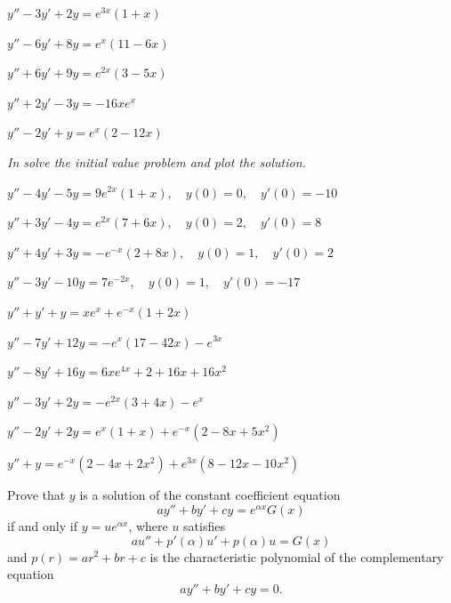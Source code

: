 \begin{exerciselistTwoColumn}
\item\label{exer:5.4.15}$y''-3y'+2y=e^{3x}(1+x)$ 
\item\label{exer:5.4.16}$y''-6y'+8y=e^x(11-6x)$
\item\label{exer:5.4.17}$ y''+6y'+9y=e^{2x}(3-5x)$ 
\item\label{exer:5.4.18}$y''+2y'-3y=-16xe^x$
\item\label{exer:5.4.19}$y''-2y'+y=e^x(2-12x)$
\end{exerciselistTwoColumn}
%
\textsl{In  solve the
initial value problem and plot the solution.}

\begin{exerciselist}
\item\label{exer:5.4.20}\CGex $y''-4y'-5y=9e^{2x}(1+x), \quad  y(0)=0,\quad y'(0)=-10$
\item\label{exer:5.4.21}\CGex $y''+3y'-4y=e^{2x}(7+6x), \quad  y(0)=2,\quad y'(0)=8$
\item\label{exer:5.4.22}\CGex $y''+4y'+3y=-e^{-x}(2+8x), \quad  y(0)=1,\quad y'(0)=2$
\item\label{exer:5.4.23}\CGex $y''-3y'-10y=7e^{-2x}, \quad  y(0)=1,\quad y'(0)=-17$



\item\label{exer:5.4.24}$y''+y'+y=xe^x+e^{-x}(1+2x)$
\item\label{exer:5.4.25}$y''-7y'+12y=-e^x(17-42x)-e^{3x}$
\item\label{exer:5.4.26}$y''-8y'+16y=6xe^{4x}+2+16x+16x^2$
\item\label{exer:5.4.27}$y''-3y'+2y=-e^{2x}(3+4x)-e^x$
\item\label{exer:5.4.28}$y''-2y'+2y=e^x(1+x)+e^{-x}(2-8x+5x^2)$
\item\label{exer:5.4.29}$y''+y=e^{-x}(2-4x+2x^2)+e^{3x}(8-12x-10x^2)$

\item\label{exer:5.4.30}\begin{alist}
 \item %
Prove that  $y$ is a solution of the constant coefficient equation
\[
ay''+by'+cy=e^{\alpha x}G(x)
\tag{A}
\]
if and only if $y=ue^{\alpha x}$, where $u$ satisfies
\[
au''+p'(\alpha)u'+p(\alpha)u=G(x)
\tag{B}
\]
and   $p(r)=ar^2+br+c$ is the characteristic polynomial of
the complementary equation
\[
ay''+by'+cy=0.
\]


\end{alist}
\end{exerciselist}
